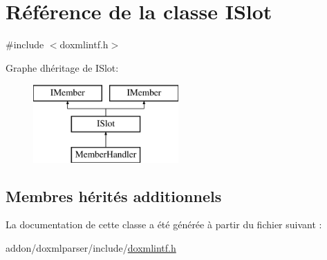 \hypertarget{class_i_slot}{}\section{Référence de la classe I\+Slot}
\label{class_i_slot}


{\ttfamily \#include $<$doxmlintf.\+h$>$}

Graphe d\textquotesingle{}héritage de I\+Slot\+:\begin{figure}[H]
\begin{center}
\leavevmode
\includegraphics[height=3.000000cm]{class_i_slot}
\end{center}
\end{figure}
\subsection*{Membres hérités additionnels}


La documentation de cette classe a été générée à partir du fichier suivant \+:\begin{DoxyCompactItemize}
\item 
addon/doxmlparser/include/\hyperlink{include_2doxmlintf_8h}{doxmlintf.\+h}\end{DoxyCompactItemize}
